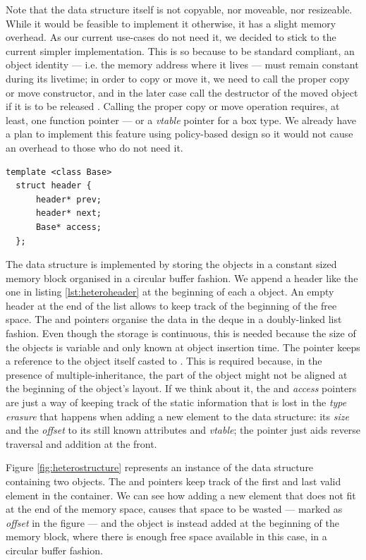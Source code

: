 Note that the data structure itself is not copyable, nor moveable, nor
resizeable. While it would be feasible to implement it otherwise, it
has a slight memory overhead. As our current use-cases do not need it,
we decided to stick to the current simpler implementation. This is so
because to be standard compliant, an object identity --- i.e. the
memory address where it lives --- must remain constant during its
livetime; in order to copy or move it, we need to call the proper copy
or move constructor, and in the later case call the destructor of the
moved object if it is to be released \cite{cppstd}. Calling the proper
copy or move operation requires, at least, one function pointer --- or
a \emph{vtable} pointer for a box type. We already have a plan to
implement this feature using policy-based
design \cite{alexandrescu01modern} so it would not cause an overhead
to those who do not need it.

\begin{lstlisting}[float=h!,caption=Header of heterogeneous deque elements,label=lst:heteroheader]
  template <class Base>
  struct header {
      header* prev;
      header* next;
      Base* access;
  };
\end{lstlisting}

The data structure is implemented by storing the objects in a constant
sized memory block organised in a circular buffer fashion.  We append
a header like the one in listing \ref{lst:heteroheader} at the
beginning of each a object. An empty header at the end of the list
allows to keep track of the beginning of the free space. The
 and  pointers organise the data in the deque in
a doubly-linked list fashion. Even though the storage is continuous,
this is needed because the size of the objects is variable and only
known at object insertion time. The  pointer keeps a
reference to the object itself casted to . This is
required because, in the presence of multiple-inheritance, the
 part of the object might not be aligned at the beginning
of the object's layout. If we think about it, the  and
\emph{access} pointers are just a way of keeping track of the
static information that is lost in the \emph{type erasure}
that happens when adding a new element to the data structure: its
\emph{size} and the \emph{offset} to its still known attributes and
\emph{vtable}; the  pointer just aids reverse traversal and
addition at the front.

Figure \ref{fig:heterostructure} represents an instance of the data
structure containing two objects. The  and 
pointers keep track of the first and last valid element in the
container. We can see how adding a new element that does not fit at
the end of the memory space, causes that space to be wasted --- marked
as \emph{offset} in the figure --- and the object is instead added at
the beginning of the memory block, where there is enough free space
available in this case, in a circular buffer fashion.

